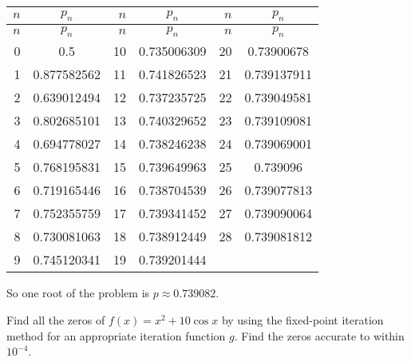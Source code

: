 \documentclass[../../../../Assignments]{subfiles}
\begin{document}
\begin{solution}
\begin{enumerate}[label = \alph*)]
            \begin{longtable}{r S[table-format=1.9] r S[table-format=1.9] r S[table-format=1.9]}
                \toprule
                \(n\)  &   {\(p_n\)}   &  \(n\)  &   {\(p_n\)}   &  \(n\)  &   {\(p_n\)}   \\
                \midrule
                \endfirsthead
                \(n\)  &   {\(p_n\)}   &  \(n\)  &   {\(p_n\)}   &  \(n\)  &   {\(p_n\)}   \\
                \midrule
                  &  0.5          &     10  &  0.735006309  &     20  & 0.73900678    \\
                    1  &  0.877582562  &     11  &  0.741826523  &     21  & 0.739137911   \\
                    2  &  0.639012494  &     12  &  0.737235725  &     22  & 0.739049581   \\
                    3  &  0.802685101  &     13  &  0.740329652  &     23  & 0.739109081   \\
                    4  &  0.694778027  &     14  &  0.738246238  &     24  & 0.739069001   \\
                    5  &  0.768195831  &     15  &  0.739649963  &     25  & 0.739096      \\
                    6  &  0.719165446  &     16  &  0.738704539  &     26  & 0.739077813   \\
                    7  &  0.752355759  &     17  &  0.739341452  &     27  & 0.739090064   \\
                    8  &  0.730081063  &     18  &  0.738912449  &     28  & 0.739081812   \\
                    9  &  0.745120341  &     19  &  0.739201444  &         &               \\
               \bottomrule
            \end{longtable}

            So one root of the problem is \(p \approx \num{0.739082}\).
    \end{enumerate}
\end{solution}

\begin{exercise}
    Find all the zeros of \(f(x) = x^2 + 10 \cos{x}\) by using the fixed-point
    iteration method for an appropriate iteration function \(g\). Find the zeros
    accurate to within \(10^{-4}\).
\end{exercise}
\end{document}
